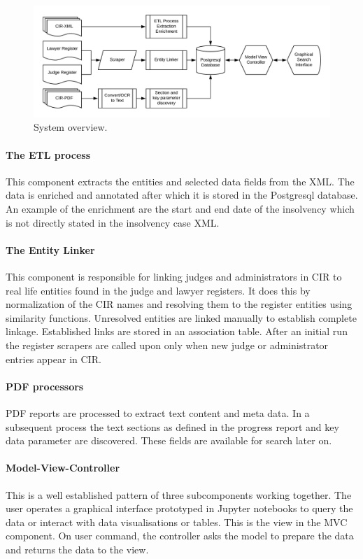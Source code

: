 \begin{figure}[h]
\includegraphics[width=1\linewidth]{system_overview.png}
\caption{System overview.}\label{System overview}
\end{figure}

\paragraph{The ETL process} This component extracts the entities and selected data fields from the XML. The data is enriched and annotated after which it is stored in the Postgresql database. An example of the enrichment are the start and end date of the insolvency which is not directly stated in the insolvency case XML.

\paragraph{The Entity Linker} This component is responsible for linking judges and administrators in CIR to real life entities found in the judge and lawyer registers. It does this by normalization of the CIR names and resolving them to the register entities using similarity functions. Unresolved entities are linked manually to establish complete linkage. Established links are stored in an association table. After an initial run the register scrapers are called upon only when new judge or administrator entries appear in CIR.

\paragraph{PDF processors}
PDF reports are processed to extract text content and meta data. In a subsequent process the text sections as defined in the progress report and key data parameter are discovered. These fields are available for search later on.

\paragraph{Model-View-Controller}
This is a well established pattern of three subcomponents working together. The user operates a graphical interface prototyped in Jupyter notebooks to query the data or interact with data visualisations or tables. This is the view in the MVC component. On user command, the controller asks the model to prepare the data and returns the data to the view.

